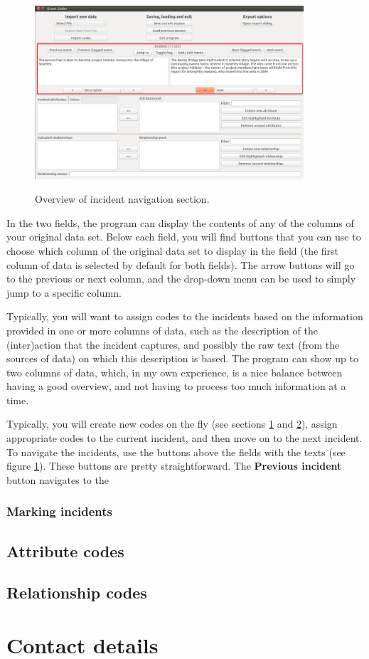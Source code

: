 \documentclass{memoir}
\begin{document}
\begin{figure}[h!]
  \centering
  \caption{Overview of incident navigation section.}
  \includegraphics[width=100mm]{Screenshot_4.pdf}
  \label{fig:incidentsoverview}
\end{figure}

In the two fields, the program can display the contents of any of the columns of your original data set. Below each field, you will find buttons that you can use to choose which column of the original data set to display in the field (the first column of data is selected by default for both fields). The arrow buttons will go to the previous or next column, and the drop-down menu can be used to simply jump to a specific column. 

Typically, you will want to assign codes to the incidents based on the information provided in one or more columns of data, such as the description of the (inter)action that the incident captures, and possibly the raw text (from the sources of data) on which this description is based. The program can show up to two columns of data, which, in my own experience, is a nice balance between having a good overview, and not having to process too much information at a time.

Typically, you will create new codes on the fly (see sections \ref{sec:attributes} and \ref{sec:relationships}), assign appropriate codes to the current incident, and then move on to the next incident. To navigate the incidents, use the buttons above the fields with the texts  (see figure \ref{fig:incidentsoverview}). These buttons are pretty straightforward. The \textbf{Previous incident} button navigates to the 

\subsection{Marking incidents}
\label{sec:markingincidents}

\section{Attribute codes}
\label{sec:attributes}

\section{Relationship codes}
\label{sec:relationships}




\chapter{Contact details}
\label{chap:contactdetails}
\end{document}
